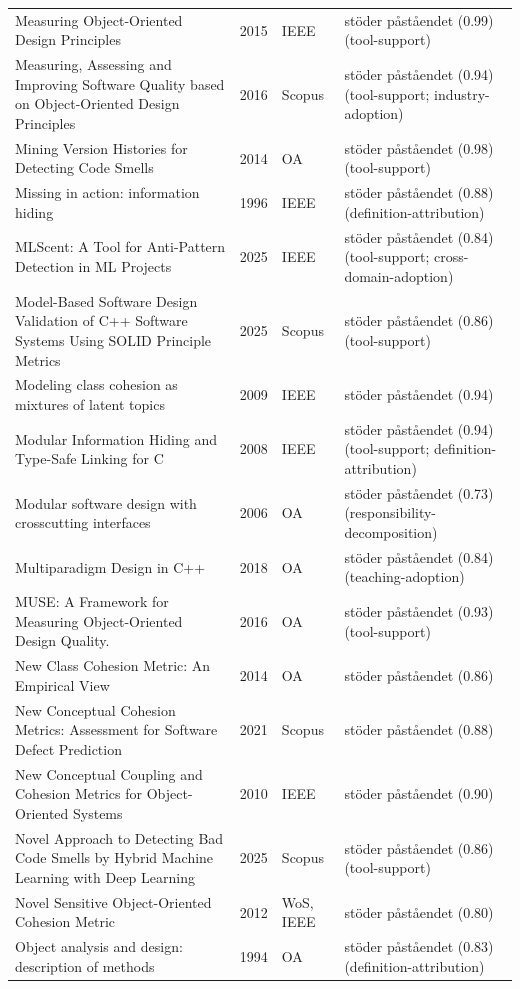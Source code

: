 \begin{longtable}{@{}%
  >{\raggedright\arraybackslash}p{}c%
  >{\raggedright\arraybackslash}p{}%
  >{\raggedright\arraybackslash}p{}@{}}
Measuring Object-Oriented Design Principles & 2015 & IEEE & stöder påståendet (0.99) (tool-support) \\
Measuring, Assessing and Improving Software Quality based on Object-Oriented Design Principles & 2016 & Scopus & stöder påståendet (0.94) (tool-support; industry-adoption) \\
Mining Version Histories for Detecting Code Smells & 2014 & OA & stöder påståendet (0.98) (tool-support) \\
Missing in action: information hiding & 1996 & IEEE & stöder påståendet (0.88) (definition-attribution) \\
MLScent: A Tool for Anti-Pattern Detection in ML Projects & 2025 & IEEE & stöder påståendet (0.84) (tool-support; cross-domain-adoption) \\
Model-Based Software Design Validation of C++ Software Systems Using SOLID Principle Metrics & 2025 & Scopus & stöder påståendet (0.86) (tool-support) \\
Modeling class cohesion as mixtures of latent topics & 2009 & IEEE & stöder påståendet (0.94) \\
Modular Information Hiding and Type-Safe Linking for C & 2008 & IEEE & stöder påståendet (0.94) (tool-support; definition-attribution) \\
Modular software design with crosscutting interfaces & 2006 & OA & stöder påståendet (0.73) (responsibility-decomposition) \\
Multiparadigm Design in C++ & 2018 & OA & stöder påståendet (0.84) (teaching-adoption) \\
MUSE: A Framework for Measuring Object-Oriented Design Quality. & 2016 & OA & stöder påståendet (0.93) (tool-support) \\
New Class Cohesion Metric: An Empirical View & 2014 & OA & stöder påståendet (0.86) \\
New Conceptual Cohesion Metrics: Assessment for Software Defect Prediction & 2021 & Scopus & stöder påståendet (0.88) \\
New Conceptual Coupling and Cohesion Metrics for Object-Oriented Systems & 2010 & IEEE & stöder påståendet (0.90) \\
Novel Approach to Detecting Bad Code Smells by Hybrid Machine Learning with Deep Learning & 2025 & Scopus & stöder påståendet (0.86) (tool-support) \\
Novel Sensitive Object-Oriented Cohesion Metric & 2012 & WoS, IEEE & stöder påståendet (0.80) \\
Object analysis and design: description of methods & 1994 & OA & stöder påståendet (0.83) (definition-attribution) \\

\end{longtable}
